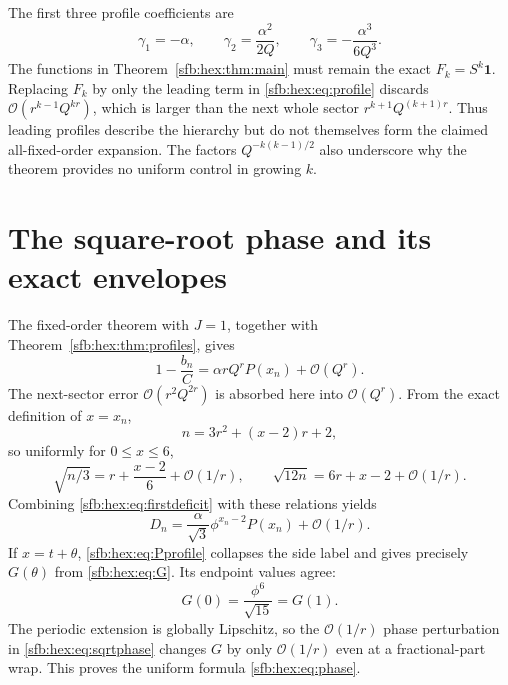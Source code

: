 \documentclass[11pt]{article}
\theoremstyle{remark}\newtheorem{remark}[theorem]{Remark}
\newcommand{\OO}{\mathcal O}
\newcommand{\one}{\boldsymbol 1}
\begin{document}
The first three profile coefficients are
\[
 \gamma_1=-\alpha,\qquad \gamma_2=\frac{\alpha^2}{2Q},\qquad
 \gamma_3=-\frac{\alpha^3}{6Q^3}.
\]
The functions in Theorem~\ref{sfb:hex:thm:main} must remain the exact $F_k=S^k\one$. Replacing $F_k$ by only the leading term in \eqref{sfb:hex:eq:profile} discards $\OO(r^{k-1}Q^{kr})$, which is larger than the next whole sector $r^{k+1}Q^{(k+1)r}$. Thus leading profiles describe the hierarchy but do not themselves form the claimed all-fixed-order expansion. The factors $Q^{-k(k-1)/2}$ also underscore why the theorem provides no uniform control in growing $k$.

\section{The square-root phase and its exact envelopes}\label{sfb:hex:sec:phaseproof}
The fixed-order theorem with $J=1$, together with Theorem~\ref{sfb:hex:thm:profiles}, gives
\begin{equation}\label{sfb:hex:eq:firstdeficit}
 1-\frac{b_n}{C}=\alpha rQ^rP(x_n)+\OO(Q^r).
\end{equation}
The next-sector error $\OO(r^2Q^{2r})$ is absorbed here into $\OO(Q^r)$. From the exact definition of $x=x_n$,
\begin{equation}\label{sfb:hex:eq:nphase}
 n=3r^2+(x-2)r+2,
\end{equation}
so uniformly for $0\le x\le6$,
\begin{equation}\label{sfb:hex:eq:sqrtphase}
 \sqrt{n/3}=r+\frac{x-2}{6}+\OO(1/r),\qquad
 \sqrt{12n}=6r+x-2+\OO(1/r).
\end{equation}
Combining \eqref{sfb:hex:eq:firstdeficit} with these relations yields
\begin{equation}\label{sfb:hex:eq:Dphase}
 D_n=\frac{\alpha}{\sqrt3}\phi^{x_n-2}P(x_n)+\OO(1/r).
\end{equation}
If $x=t+\theta$, \eqref{sfb:hex:eq:Pprofile} collapses the side label and gives precisely $G(\theta)$ from \eqref{sfb:hex:eq:G}. Its endpoint values agree:
\[
 G(0)=\frac{\phi^6}{\sqrt{15}}=G(1).
\]
The periodic extension is globally Lipschitz, so the $\OO(1/r)$ phase perturbation in \eqref{sfb:hex:eq:sqrtphase} changes $G$ by only $\OO(1/r)$ even at a fractional-part wrap. This proves the uniform formula \eqref{sfb:hex:eq:phase}.
\end{document}
